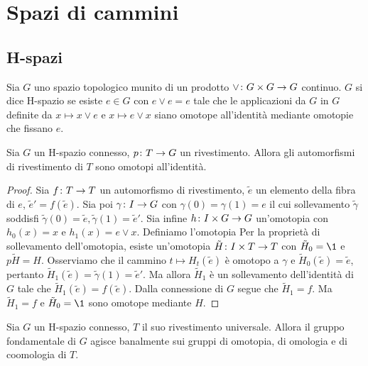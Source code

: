 \chapter{Spazi di cammini}
\section{H-spazi}
\begin{definition}
Sia $G$ uno spazio topologico munito di un prodotto $\vee\colon G\times G\to G$ continuo. $G$ si dice H-spazio se esiste $e\in G$ con $e\vee e=e$ tale che le applicazioni da $G$ in $G$ definite da $x\mapsto x\vee e$ e $x\mapsto e\vee x$ siano omotope all'identità mediante omotopie che fissano $e$.
\end{definition}
\begin{proposition}
Sia $G$ un H-spazio connesso, $p\colon T\to G$ un rivestimento. Allora gli automorfismi di rivestimento di $T$ sono omotopi all'identità.
\end{proposition}
\begin{proof}
Sia $f\colon T\to T$ un automorfismo di rivestimento, $\tilde{e}$ un elemento della fibra di $e$, $\tilde{e}'=f(\tilde{e})$. Sia poi $\gamma\colon I\to G$ con $\gamma(0)=\gamma(1)=e$ il cui sollevamento $\tilde\gamma$ soddisfi $\tilde\gamma(0)=\tilde{e},\tilde\gamma(1)=\tilde{e}'$. Sia infine $h\colon I\times G\to G$ un'omotopia con $h_0(x)=x$ e $h_1(x)=e\vee x$. Definiamo l'omotopia
Per la proprietà di sollevamento dell'omotopia, esiste un'omotopia $\tilde{H}\colon I\times T\to T$ con $\tilde{H}_0=\1$ e $p\tilde{H}=H$. Osserviamo che il cammino $t\mapsto H_t(\tilde{e})$ è omotopo a $\gamma$ e $\tilde{H}_0(\tilde{e})=\tilde{e}$, pertanto $\tilde{H}_1(\tilde{e})=\tilde{\gamma}(1)=\tilde{e}'$. Ma allora $\tilde{H}_1$ è un sollevamento dell'identità di $G$ tale che $\tilde{H}_1(\tilde{e})=f(\tilde{e})$. Dalla connessione di $G$ segue che $\tilde{H}_1=f$. Ma $\tilde{H}_1=f$ e $\tilde{H}_0=\1$ sono omotope mediante $H$.
\end{proof}
\begin{corollary}
Sia $G$ un H-spazio connesso, $T$ il suo rivestimento universale. Allora il gruppo fondamentale di $G$ agisce banalmente sui gruppi di omotopia, di omologia e di coomologia di $T$.
\end{corollary}

